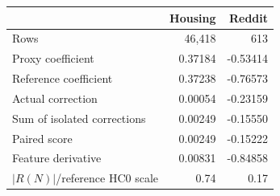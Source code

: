 \begin{tabular}{lrr}
\toprule
 & Housing & Reddit \\
\midrule
Rows & 46,418 & 613 \\
Proxy coefficient & 0.37184 & -0.53414 \\
Reference coefficient & 0.37238 & -0.76573 \\
Actual correction & 0.00054 & -0.23159 \\
Sum of isolated corrections & 0.00249 & -0.15550 \\
Paired score & 0.00249 & -0.15222 \\
Feature derivative & 0.00831 & -0.84858 \\
$|R(N)|$/reference HC0 scale & 0.74 & 0.17 \\
\bottomrule
\end{tabular}
